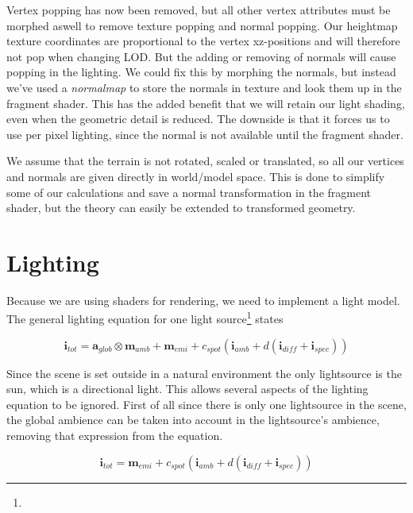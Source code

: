 
Vertex popping has now been removed, but all other vertex attributes
must be morphed aswell to remove texture popping and normal
popping. Our heightmap texture coordinates are proportional to the
vertex xz-positions and will therefore not pop when changing LOD. But
the adding or removing of normals will cause popping in the
lighting. We could fix this by morphing the normals, but instead we've
used a \emph{normalmap} to store the normals in texture and look them
up in the fragment shader. This has the added benefit that we will
retain our light shading, even when the geometric detail is
reduced. The downside is that it forces us to use per pixel lighting,
since the normal is not available until the fragment shader.

We assume that the terrain is not rotated, scaled or translated, so
all our vertices and normals are given directly in world/model
space. This is done to simplify some of our calculations and save a
normal transformation in the fragment shader, but the theory can
easily be extended to transformed geometry.

\section{Lighting}

Because we are using shaders for rendering, we need to implement a
light model. The general lighting equation for one light
source\footnote{} states

\begin{displaymath}
  \mathbf{i}_{tot} = \mathbf{a}_{glob} \otimes \mathbf{m}_{amb} +
  \mathbf{m}_{emi} + c_{spot}(\mathbf{i}_{amb} + d(\mathbf{i}_{diff} + \mathbf{i}_{spec}))
\end{displaymath}

Since the scene is set outside in a natural environment the only
lightsource is the sun, which is a directional light. This allows
several aspects of the lighting equation to be ignored. First of all
since there is only one lightsource in the scene, the global ambience
can be taken into account in the lightsource's ambience, removing that
expression from the equation.

\begin{displaymath}
  \mathbf{i}_{tot} = \mathbf{m}_{emi} + c_{spot}(\mathbf{i}_{amb} + d(\mathbf{i}_{diff} + \mathbf{i}_{spec}))
\end{displaymath}

